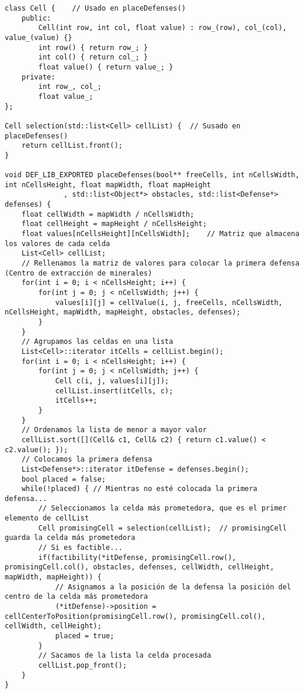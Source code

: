 \begin{lstlisting}
class Cell {    // Usado en placeDefenses()
    public:
        Cell(int row, int col, float value) : row_(row), col_(col), value_(value) {}
        int row() { return row_; }
        int col() { return col_; }
        float value() { return value_; }
    private:
        int row_, col_;
        float value_;
};

Cell selection(std::list<Cell> cellList) {  // Susado en placeDefenses()
    return cellList.front();
}

void DEF_LIB_EXPORTED placeDefenses(bool** freeCells, int nCellsWidth, int nCellsHeight, float mapWidth, float mapHeight
              , std::list<Object*> obstacles, std::list<Defense*> defenses) {
    float cellWidth = mapWidth / nCellsWidth;
    float cellHeight = mapHeight / nCellsHeight; 
    float values[nCellsHeight][nCellsWidth];    // Matriz que almacena los valores de cada celda
    List<Cell> cellList;
    // Rellenamos la matriz de valores para colocar la primera defensa (Centro de extracción de minerales)
    for(int i = 0; i < nCellsHeight; i++) {
        for(int j = 0; j < nCellsWidth; j++) {
            values[i][j] = cellValue(i, j, freeCells, nCellsWidth, nCellsHeight, mapWidth, mapHeight, obstacles, defenses);
        }
    }
    // Agrupamos las celdas en una lista
    List<Cell>::iterator itCells = cellList.begin();
    for(int i = 0; i < nCellsHeight; i++) {
        for(int j = 0; j < nCellsWidth; j++) {
            Cell c(i, j, values[i][j]);
            cellList.insert(itCells, c);
            itCells++;
        }
    }
    // Ordenamos la lista de menor a mayor valor
    cellList.sort([](Cell& c1, Cell& c2) { return c1.value() < c2.value(); });
    // Colocamos la primera defensa
    List<Defense*>::iterator itDefense = defenses.begin();
    bool placed = false;
    while(!placed) { // Mientras no esté colocada la primera defensa...
        // Seleccionamos la celda más prometedora, que es el primer elemento de cellList
        Cell promisingCell = selection(cellList);  // promisingCell guarda la celda más prometedora
        // Si es factible...
        if(factibility(*itDefense, promisingCell.row(), promisingCell.col(), obstacles, defenses, cellWidth, cellHeight, mapWidth, mapHeight)) {
            // Asignamos a la posición de la defensa la posición del centro de la celda más prometedora
            (*itDefense)->position = cellCenterToPosition(promisingCell.row(), promisingCell.col(), cellWidth, cellHeight);
            placed = true;
        }
        // Sacamos de la lista la celda procesada
        cellList.pop_front();
    }
}
\end{lstlisting}